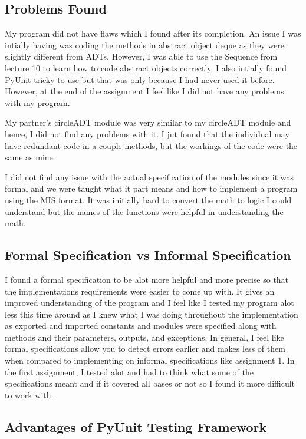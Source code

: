 \documentclass[12pt]{article}
\begin{document}
\subsection{Problems Found}

My program did not have flaws which I found after its completion. An issue I was intially having was coding the methods in abstract object deque as they were slightly different from ADTs. However, I was able to use the Sequence from lecture 10 to learn how to code abstract objects correctly. I also intially found PyUnit tricky to use but that was only because I had never used it before. However, at the end of the assignment I feel like I did not have any problems with my program. 


My partner's circleADT module was very similar to my circleADT module and hence, I did not find any problems with it. I jut found that the individual may have redundant code in a couple methods, but the workings of the code were the same as mine. 


I did not find any issue with the actual specification of the modules since it was formal and we were taught what it part means and how to implement a program using the MIS format. It was initially hard to convert the math to logic I could understand but the names of the functions were helpful in understanding the math. 

\subsection{Formal Specification vs Informal Specification}

I found a formal specification to be alot more helpful and more precise so that the implementations requirements were easier to come up with. It gives an improved understanding of the program and I feel like I tested my program alot less this time around as I knew what I was doing throughout the implementation as exported and imported constants and modules were specified along with methods and their parameters, outputs, and exceptions. In general, I feel like formal specifications allow you to detect errors earlier and makes less of them when compared to implementing on informal specifications like assignment 1. In the first assignment, I tested alot and had to think what some of the specifications meant and if it covered all bases or not so I found it more difficult to work with.

\subsection{Advantages of PyUnit Testing Framework}
\end{document}
